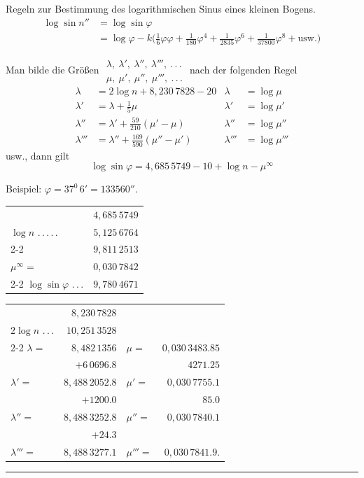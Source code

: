 Regeln zur Bestimmung des logarithmischen Sinus eines kleinen Bogens.
\[
\begin{aligned}
\log\sin n''&=\log\sin\varphi\\
&=\log\varphi-k\bigl(\tfrac16\varphi\varphi+\tfrac1{180}\varphi^4+\tfrac1{2835}\varphi^6+\tfrac1{37800}\varphi^8+\text{usw.}\bigr)
\end{aligned}
\]

Man bilde die Größen \(\begin{smallmatrix}\lambda,\ \lambda',\ \lambda'',\ \lambda''',\ .\,.\,.\\\mu,\ \mu',\ \mu'',\ \mu''',\ .\,.\,.\end{smallmatrix}\) nach der folgenden Regel
\[
\begin{aligned}
\lambda&=2\log n+8{,}230\,7828-20&\lambda&=\log\mu\\
\lambda'&=\lambda+\tfrac15\mu&\lambda'&=\log\mu'\\
\lambda''&=\lambda'+\tfrac{59}{210}(\mu'-\mu)&\lambda''&=\log\mu''\\
\lambda'''&=\lambda''+\tfrac{169}{590}(\mu''-\mu')&\lambda'''&=\log\mu'''
\end{aligned}
\]
\noindent usw.,
dann gilt
\[
\log\sin\varphi=4{,}685\,5749-10+\log n-\mu^{\infty}
\]

Beispiel: \(\varphi=37^0\,6'=133560''\).
\begin{center}
\begin{tabular}{@{}lr@{}}
&\(4{,}685\,5749\)\\
\(\log n\) .\,.\,.\,.\,.&\(5{,}125\,6764\)\\
\cline{2-2}
&\(9{,}811\,2513\)\\
\(\mu^{\infty}=\)&\(0{,}030\,7842\)\\
\cline{2-2}
\(\log\sin\varphi\) .\,.\,.&\(9{,}780\,4671\)
\end{tabular}
\end{center}
\begin{center}
\begin{tabular}{@{}lr@{\qquad}lr@{}}
&\(8{,}230\,7828\)&&\\
\(2\log n\) .\,.\,.&\(10{,}251\,3528\)&&\\
\cline{2-2}
\(\lambda=\)&\(8{,}482\,1356\)&\(\mu=\)&\(0{,}030\,3483.85\)\\
&\(+6\,0696.8\)&&\(4271.25\)\\
\(\lambda'=\)&\(8{,}488\,2052.8\)&\(\mu'=\)&\(0{,}030\,7755.1\)\\
&\(+1200.0\)&&\(85.0\)\\
\(\lambda''=\)&\(8{,}488\,3252.8\)&\(\mu''=\)&\(0{,}030\,7840.1\)\\
&\(+24.3\)&&\\
\(\lambda'''=\)&\(8{,}488\,3277.1\)&\(\mu'''=\)&\(0{,}030\,7841.9\).
\end{tabular}
\end{center}
\begin{center}\rule{.18\textwidth}{.35pt}\end{center}
